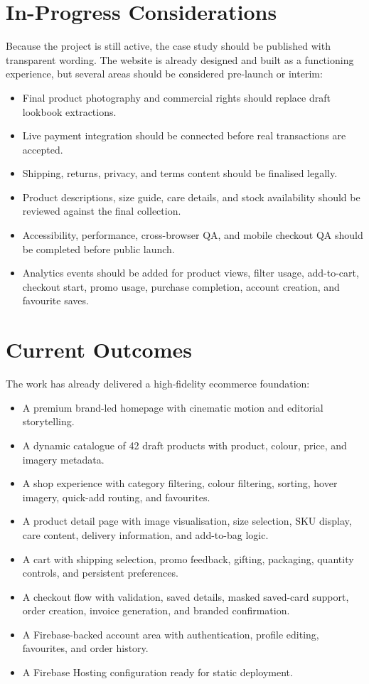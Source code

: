 \documentclass[11pt,a4paper]{article}
\begin{document}
\section{In-Progress Considerations}

Because the project is still active, the case study should be published with transparent wording. The website is already designed and built as a functioning experience, but several areas should be considered pre-launch or interim:

\begin{itemize}
    \item Final product photography and commercial rights should replace draft lookbook extractions.
    \item Live payment integration should be connected before real transactions are accepted.
    \item Shipping, returns, privacy, and terms content should be finalised legally.
    \item Product descriptions, size guide, care details, and stock availability should be reviewed against the final collection.
    \item Accessibility, performance, cross-browser QA, and mobile checkout QA should be completed before public launch.
    \item Analytics events should be added for product views, filter usage, add-to-cart, checkout start, promo usage, purchase completion, account creation, and favourite saves.
\end{itemize}

\section{Current Outcomes}

The work has already delivered a high-fidelity ecommerce foundation:

\begin{itemize}
    \item A premium brand-led homepage with cinematic motion and editorial storytelling.
    \item A dynamic catalogue of 42 draft products with product, colour, price, and imagery metadata.
    \item A shop experience with category filtering, colour filtering, sorting, hover imagery, quick-add routing, and favourites.
    \item A product detail page with image visualisation, size selection, SKU display, care content, delivery information, and add-to-bag logic.
    \item A cart with shipping selection, promo feedback, gifting, packaging, quantity controls, and persistent preferences.
    \item A checkout flow with validation, saved details, masked saved-card support, order creation, invoice generation, and branded confirmation.
    \item A Firebase-backed account area with authentication, profile editing, favourites, and order history.
    \item A Firebase Hosting configuration ready for static deployment.
\end{itemize}
\end{document}
